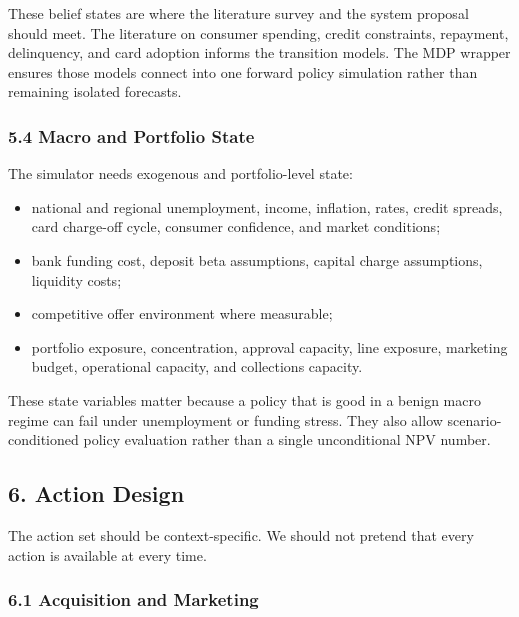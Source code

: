 \documentclass[
]{article}
\providecommand{\tightlist}{%
  \setlength{\itemsep}{0pt}\setlength{\parskip}{0pt}}
\begin{document}
These belief states are where the literature survey and the system
proposal should meet. The literature on consumer spending, credit
constraints, repayment, delinquency, and card adoption informs the
transition models. The MDP wrapper ensures those models connect into one
forward policy simulation rather than remaining isolated forecasts.

\hypertarget{macro-and-portfolio-state}{%
\subsubsection{5.4 Macro and Portfolio
State}\label{macro-and-portfolio-state}}

The simulator needs exogenous and portfolio-level state:

\begin{itemize}
\tightlist
\item
  national and regional unemployment, income, inflation, rates, credit
  spreads, card charge-off cycle, consumer confidence, and market
  conditions;
\item
  bank funding cost, deposit beta assumptions, capital charge
  assumptions, liquidity costs;
\item
  competitive offer environment where measurable;
\item
  portfolio exposure, concentration, approval capacity, line exposure,
  marketing budget, operational capacity, and collections capacity.
\end{itemize}

These state variables matter because a policy that is good in a benign
macro regime can fail under unemployment or funding stress. They also
allow scenario-conditioned policy evaluation rather than a single
unconditional NPV number.

\hypertarget{action-design}{%
\subsection{6. Action Design}\label{action-design}}

The action set should be context-specific. We should not pretend that
every action is available at every time.

\hypertarget{acquisition-and-marketing}{%
\subsubsection{6.1 Acquisition and
Marketing}\label{acquisition-and-marketing}}
\end{document}
